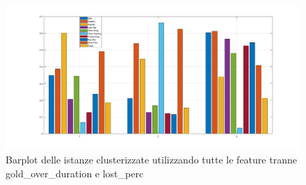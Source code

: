 \documentclass[a4paper,12pt,openany,oneside]{book}
\begin{document}
\begin{figure}[H]
	\includegraphics[width=\linewidth]{pics/no8_11/barplot.png}
	\caption{Barplot delle istanze clusterizzate utilizzando tutte le feature tranne gold\_over\_duration e lost\_perc}
	\label{fig:baroplot_2}
\end{figure}
\end{document}
